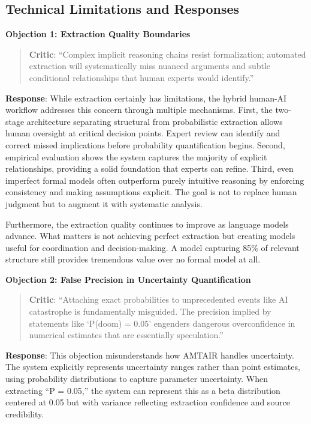 \documentclass[
  11pt,
  letterpaper,
]{book}
\begin{document}
\subsection{Technical Limitations and
Responses}\label{sec-technical-limitations}

\textbf{Objection 1: Extraction Quality Boundaries}

\begin{quote}
\textbf{Critic}: ``Complex implicit reasoning chains resist
formalization; automated extraction will systematically miss nuanced
arguments and subtle conditional relationships that human experts would
identify.''
\end{quote}

\textbf{Response}: While extraction certainly has limitations, the
hybrid human-AI workflow addresses this concern through multiple
mechanisms. First, the two-stage architecture separating structural from
probabilistic extraction allows human oversight at critical decision
points. Expert review can identify and correct missed implications
before probability quantification begins. Second, empirical evaluation
shows the system captures the majority of explicit relationships,
providing a solid foundation that experts can refine. Third, even
imperfect formal models often outperform purely intuitive reasoning by
enforcing consistency and making assumptions explicit. The goal is not
to replace human judgment but to augment it with systematic analysis.

Furthermore, the extraction quality continues to improve as language
models advance. What matters is not achieving perfect extraction but
creating models useful for coordination and decision-making. A model
capturing 85\% of relevant structure still provides tremendous value
over no formal model at all.

\textbf{Objection 2: False Precision in Uncertainty Quantification}

\begin{quote}
\textbf{Critic}: ``Attaching exact probabilities to unprecedented events
like AI catastrophe is fundamentally misguided. The precision implied by
statements like `P(doom) = 0.05' engenders dangerous overconfidence in
numerical estimates that are essentially speculation.''
\end{quote}

\textbf{Response}: This objection misunderstands how AMTAIR handles
uncertainty. The system explicitly represents uncertainty ranges rather
than point estimates, using probability distributions to capture
parameter uncertainty. When extracting ``P = 0.05,'' the system can
represent this as a beta distribution centered at 0.05 but with variance
reflecting extraction confidence and source credibility.
\end{document}
